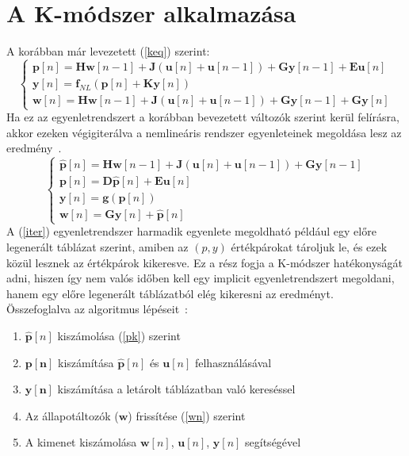 \section{A K-módszer alkalmazása}
A korábban már levezetett (\ref{keq}) szerint:
\begin{equation}
    \begin{cases}
        \mathbf{p}[n]=\mathbf{Hw}[n-1]+\mathbf{J}(\mathbf{u}[n]+\mathbf{u}[n-1])+\mathbf{G}\mathbf{y}[n-1]+\mathbf{Eu}[n] \\
        \mathbf{y}[n]=\mathbf{f}_{NL}(\mathbf{p}[n]+\mathbf{Ky}[n]) \\
        \mathbf{w}[n]=\mathbf{Hw}[n-1]+\mathbf{J}(\mathbf{u}[n]+\mathbf{u}[n-1])+\mathbf{Gy}[n-1]+\mathbf{Gy}[n]
    \end{cases}
\end{equation}
Ha ez az egyenletrendszert a korábban bevezetett változók szerint kerül felírásra, akkor ezeken 
végigiterálva a nemlineáris rendszer egyenleteinek megoldása lesz az eredmény~\cite{borin}.
\begin{equation}
    \begin{cases}
        \mathbf{\hat{p}}[n]=\mathbf{Hw}[n-1]+\mathbf{J}(\mathbf{u}[n]+\mathbf{u}[n-1])+\mathbf{Gy}[n-1] \\
        \mathbf{p}[n]=\mathbf{D\hat{p}}[n]+\mathbf{Eu}[n] \\
        \mathbf{y}[n]=\mathbf{g}(\mathbf{p}[n]) \\
        \mathbf{w}[n]=\mathbf{Gy}[n]+\mathbf{\hat{p}}[n]
    \end{cases}
   \label{iter}
\end{equation}
A (\ref{iter}) egyenletrendszer harmadik egyenlete megoldható például egy előre legenerált 
táblázat szerint, amiben az $(p,y)$ értékpárokat tároljuk le, és ezek közül lesznek az értékpárok kikeresve. 
Ez a rész fogja a K-módszer hatékonyságát adni, hiszen így nem valós időben kell egy 
implicit egyenletrendszert megoldani, hanem egy előre legenerált táblázatból elég kikeresni 
az eredményt.\\
Összefoglalva az algoritmus lépéseit~\cite{otherK}:
\begin{enumerate}
    \item $\mathbf{\hat{p}}[n]$ kiszámolása (\ref{pk}) szerint
    \item $\mathbf{p[n]}$ kiszámítása $\mathbf{\hat{p}}[n]$ és $\mathbf{u}[n]$ felhasználásával
    \item $\mathbf{y[n]}$ kiszámítása a letárolt táblázatban való kereséssel
    \item Az állapotáltozók ($\mathbf{w}$) frissítése (\ref{wn}) szerint
    \item A kimenet kiszámolása $\mathbf{w}[n]$, $\mathbf{u}[n]$, $\mathbf{y}[n]$ segítségével
\end{enumerate}

